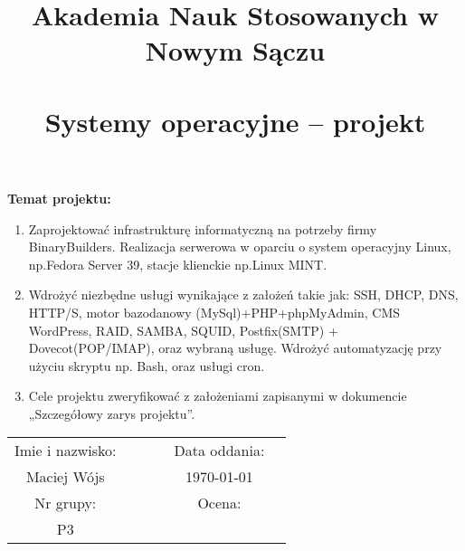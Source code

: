 \documentclass[a4paper]{article}
\title{\textbf{Akademia Nauk Stosowanych w Nowym Sączu}\\\smaller{Wydział Nauk Inżynieryjnych}\vspace*{1em} \\ \textbf{Systemy operacyjne – projekt}\vspace*{0.5em}\\\smaller{studia stacjonarne\\semestr letni 2023/2024}}
\author{}
\date{}
\begin{document}
\maketitle

\textbf{Temat projektu:}
\begin{enumerate}
      \item Zaprojektować infrastrukturę informatyczną na potrzeby firmy BinaryBuilders. Realizacja
            serwerowa w oparciu o system operacyjny Linux, np.\@ Fedora Server 39, stacje klienckie
            np.\@ Linux MINT. %

      \item Wdrożyć niezbędne usługi wynikające z założeń takie jak: SSH, DHCP, DNS, HTTP/S,
            motor bazodanowy (MySql)+PHP+phpMyAdmin, CMS WordPress, RAID, SAMBA,
            SQUID, Postfix(SMTP) + Dovecot(POP/IMAP), oraz wybraną usługę. Wdrożyć %
            automatyzację przy użyciu skryptu np. Bash, oraz usługi cron.
      \item Cele projektu zweryfikować z założeniami zapisanymi w dokumencie „Szczegółowy
            zarys projektu”.
\end{enumerate}

\renewcommand{\arraystretch}{1.25}
\setlength{\tabcolsep}{12pt}

\begin{table}[h!]
      \centering
      \begin{tabular}{cccccc}
            Imie i nazwisko: &   &  &  & Data oddania: \\
            Maciej Wójs      &   &  &  & \today        \\
            Nr grupy:        &   &  &  & Ocena:        \\
            P3               &                         \\
      \end{tabular}
\end{table}

\newpage
\tableofcontents
\newpage
\listoffigures
\newpage
\end{document}
